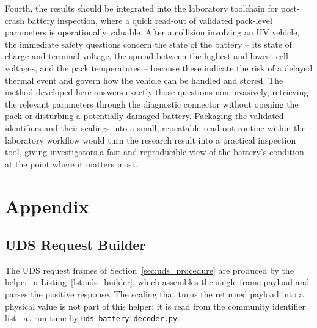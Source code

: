 \documentclass[11pt,a4paper,oneside,parskip=half]{scrreprt}
\begin{document}
Fourth, the results should be integrated into the laboratory toolchain for post-crash battery inspection, where a quick read-out of validated pack-level parameters is operationally valuable. After a collision involving an HV vehicle, the immediate safety questions concern the state of the battery -- its state of charge and terminal voltage, the spread between the highest and lowest cell voltages, and the pack temperatures -- because these indicate the risk of a delayed thermal event and govern how the vehicle can be handled and stored. The method developed here answers exactly those questions non-invasively, retrieving the relevant parameters through the diagnostic connector without opening the pack or disturbing a potentially damaged battery. Packaging the validated identifiers and their scalings into a small, repeatable read-out routine within the laboratory workflow would turn the research result into a practical inspection tool, giving investigators a fast and reproducible view of the battery's condition at the point where it matters most.

\clearpage



\clearpage
\listoftables
{}

\appendix
\chapter{Appendix}
\label{app:code}

\section{UDS Request Builder}
The UDS request frames of Section~\ref{sec:uds_procedure} are produced by the helper in Listing~\ref{lst:uds_builder}, which assembles the single-frame payload and parses the positive response. The scaling that turns the returned payload into a physical value is not part of this helper: it is read from the community identifier list~\cite{vwmebpidlist} at run time by \texttt{uds\_battery\_decoder.py}.
\end{document}
